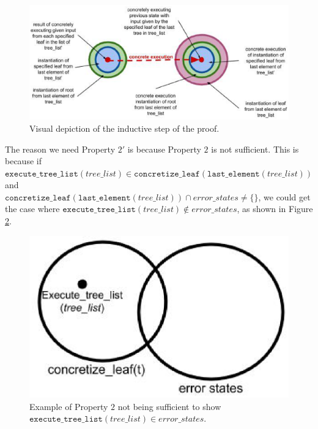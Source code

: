\begin{figure}
\centering
\includegraphics[width=.8\textwidth]{set4.eps}
\caption{Visual depiction of the inductive step of the proof.}
\label{fig:indstep}
\end{figure}

The reason we need Property $2'$ is because Property $2$ is not sufficient. 
This is because if $\mathtt{execute\_tree\_list} (tree\_list) \in \mathtt{concretize\_leaf} (\mathtt{last\_element}(tree\_list))$ and \\
$\mathtt{concretize\_leaf} (\mathtt{last\_element} (tree\_list)) \cap error\_states \neq \{\}$, we could get the case where
$\mathtt{execute\_tree\_list} (tree\_list) \notin error\_states$, as shown in Figure \ref{fig:Prop2}.

\begin{figure}
  \centering
\includegraphics[width=.4\textwidth]{prop2.eps}
\caption{Example of Property $2$ not being sufficient to show $\mathtt{execute\_tree\_list} (tree\_list) \in error\_states$.}
\label{fig:Prop2}
\end{figure}
